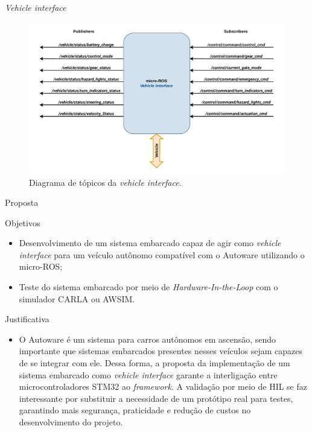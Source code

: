 \documentclass{if-beamer}
\begin{document}
\begin{frame}{\textit{Vehicle interface}}
	
	\begin{figure}
		\centering
		\includegraphics[width=0.8\linewidth]{img/vehicle_interface-topics}
		\caption{Diagrama de tópicos da \textit{vehicle interface}.}
		\label{fig:vehicleinterface-topics}
	\end{figure}
	
\end{frame}

\begin{frame}{Proposta}
	
	\begin{block}{Objetivos}
		
		\begin{itemize}
			\item Desenvolvimento de um sistema embarcado capaz de agir como \textit{vehicle interface} para um veículo autônomo compatível com o Autoware utilizando o micro-ROS;
			\item Teste do sistema embarcado por meio de \textit{Hardware-In-the-Loop} com o simulador CARLA ou AWSIM.
			
		\end{itemize}
		
	\end{block}
	
	\begin{block}{Justificativa}
	
	\begin{itemize}
		\item O Autoware é um sistema para carros autônomos em ascensão, sendo importante que sistemas embarcados presentes nesses veículos sejam capazes de se integrar com ele. Dessa forma, a proposta da implementação de um sistema embarcado como \textit{vehicle interface} garante a interligação entre microcontroladores STM32 ao \textit{framework}. A validação por meio de HIL se faz interessante por substituir a necessidade de um protótipo real para testes, garantindo mais segurança, praticidade e redução de custos no desenvolvimento do projeto.
		
	\end{itemize}
	
	\end{block}
	
\end{frame}
\end{document}
